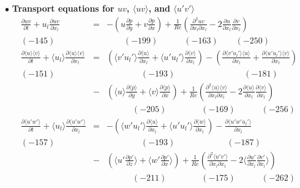\documentclass[a4paper,11pt]{article}
\begin{document}
\noindent $\bullet$  \textbf{Transport equations for $uv$, $\langle uv\rangle$, and $\langle u'v'\rangle$}
\begin{eqnarray}
\frac{\partial uv }{\partial t}
+u_l\frac{\partial uv }{\partial x_l}
&=&-(u\frac{\partial p }{\partial y}+v\frac{\partial p }{\partial x})
+\frac{1}{Re}(\frac{\partial^2 uv }{\partial x_l\partial x_l}-2\frac{\partial u }{\partial x_l}\frac{\partial v }{\partial x_l}) \\
(-145) &&\quad{}  \quad{}(-199) \quad{}  \qquad{} (-163) \quad{} \quad{} (-250)\nonumber \\
\frac{\partial \langle u\rangle \langle v\rangle }{\partial t}
+\langle u_l\rangle \frac{\partial \langle u\rangle \langle v\rangle }{\partial x_l}
&=&(\langle v'u_l'\rangle \frac{\partial \langle u \rangle}{\partial x_l}+\langle u'u_l'\rangle \frac{\partial \langle v \rangle  }{\partial x_l})
-(\frac{\partial \langle v'u_l'\rangle \langle u \rangle }{\partial x_l}+\frac{\partial \langle u'u_l'\rangle \langle v \rangle }{\partial x_l}) \nonumber \\
(-151) \quad{}&&\qquad{} \qquad{}(-193) \qquad{}\qquad{}  \qquad{} \qquad{} (-181)\nonumber \\
&-&(\langle u\rangle \frac{\partial \langle p\rangle }{\partial y}+\langle v \rangle \frac{\partial \langle p\rangle }{\partial x})
+\frac{1}{Re}(\frac{\partial^2 \langle u\rangle \langle v \rangle}{\partial x_l\partial x_l}-2\frac{\partial \langle u\rangle }{\partial x_l} \frac{\partial \langle v\rangle }{\partial x_l}) \\
&&\qquad{}\quad{} (-205) \qquad{} \qquad{}  (-169)\quad{} \qquad{} (-256)\nonumber \\
\frac{\partial \langle u'w'\rangle }{\partial t}
+\langle u_l\rangle \frac{\partial \langle u'w'\rangle }{\partial x_l}
&=&-(\langle w'u_l'\rangle \frac{\partial \langle u \rangle  }{\partial x_l}+\langle u'u_l'\rangle \frac{\partial \langle w \rangle  }{\partial x_l})
-\frac{\partial \langle u'w'u_l'\rangle}{\partial x_l}  \nonumber \\
(-157) \quad{}&&\qquad{} \qquad{}(-193)  \qquad{}\qquad{} \qquad{} (-187)\nonumber \\
&-&(\langle u' \frac{\partial  p' }{\partial z}\rangle +\langle w' \frac{\partial p' }{\partial x}\rangle)
+\frac{1}{Re}(\frac{\partial^2 \langle u'v' \rangle}{\partial x_l\partial x_l}-2\langle \frac{\partial  u' }{\partial x_l}\frac{\partial  v' }{\partial x_l}\rangle) \\
 &&\qquad{}\quad{} (-211) \qquad{} \qquad{}  (-175)\quad{} \qquad{} (-262)\nonumber 
\end{eqnarray}
\end{document}
